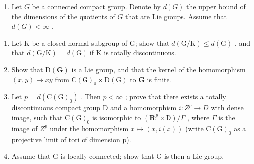 
\begin{enumerate}
\def\labelenumi{\arabic{enumi})}
\tightlist
\item
  Let \(G\) be a connected compact group. Denote by \(d(G)\) the upper bound of the dimensions of the quotients of \(G\) that are Lie groups. Assume that \(d(G) < \infty\) .
\end{enumerate}

\begin{enumerate}
\def\labelenumi{\alph{enumi})}
\item
  Let K be a closed normal subgroup of G; show that \(d(\mathrm{G}/\mathrm{K}) \leq d(\mathrm{G})\) , and that \(d(\mathrm{G}/\mathrm{K}) = d(\mathrm{G})\) if K is totally discontinuous.
\item
  Show that \(\mathrm{D}(\mathbf{G})\) is a Lie group, and that the kernel of the homomorphism \((x,y)\mapsto xy\) from \(\mathrm{C}(\mathrm{G})_0\times \mathrm{D}(\mathrm{G})\) to \(\mathbf{G}\) is finite.
\item
  Let \(p = d(\mathrm{C}(\mathrm{G})_{0})\) . Then \(p < \infty\) ; prove that there exists a totally discontinuous compact group D and a homomorphism \(i : Z^{p} \to D\) with dense image, such that \(\mathrm{C}(\mathrm{G})_{0}\) is isomorphic to \((\mathbf{R}^{p} \times \mathrm{D}) / \Gamma\) , where \(\Gamma\) is the image of \(Z^{p}\) under the homomorphism \(x \mapsto (x, i(x))\) (write \(\mathrm{C}(\mathrm{G})_{0}\) as a projective limit of tori of dimension p).
\item
  Assume that G is locally connected; show that G is then a Lie group.
\end{enumerate}

